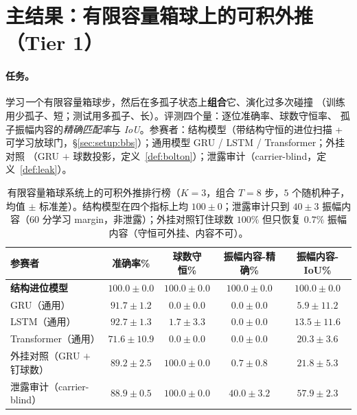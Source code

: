 \documentclass[11pt]{article}
\theoremstyle{definition}
\theoremstyle{plain}
\begin{document}
\section{主结果：有限容量箱球上的可积外推（Tier 1）}\label{sec:main}

\paragraph{任务。}
学习\emph{一}个有限容量箱球步，然后在多孤子状态上\textbf{组合}它、演化过多次碰撞
（训练用少孤子、短；测试用多孤子、长）。评测四个量：逐位准确率、球数守恒率、
孤子振幅内容的\emph{精确匹配率}与 \emph{IoU}。参赛者：结构模型（带结构守恒的进位扫描 +
可学习放球门，\S\ref{sec:setup:bbs}）；通用模型 GRU / LSTM / Transformer；外挂对照
（GRU $+$ 球数投影，定义~\ref{def:bolton}）；泄露审计（carrier-blind，定义~\ref{def:leak}）。

\begin{table}[h]
\centering
\caption{有限容量箱球系统上的可积外推排行榜（$K=3$，组合 $T=8$ 步，$5$ 个随机种子，均值 $\pm$
标准差）。结构模型在四个指标上均 $100\pm0$；泄露审计只到 $40\pm3$ 振幅内容（$60$ 分学习
margin，非泄露）；外挂对照钉住球数 $100\%$ 但只恢复 $0.7\%$ 振幅内容（守恒可外挂、内容不可）。}
\label{tab:tier1}
\begin{tabular}{lcccc}
\toprule
\textbf{参赛者} & \textbf{准确率\%} & \textbf{球数守恒\%} & \textbf{振幅内容-精确\%} & \textbf{振幅内容-IoU\%} \\
\midrule
\textbf{结构进位模型} & $\mathbf{100.0\pm0.0}$ & $\mathbf{100.0\pm0.0}$ & $\mathbf{100.0\pm0.0}$ & $\mathbf{100.0\pm0.0}$ \\
GRU（通用） & $91.7\pm1.2$ & $0.0\pm0.0$ & $0.0\pm0.0$ & $5.9\pm11.2$ \\
LSTM（通用） & $92.7\pm1.3$ & $1.7\pm3.3$ & $0.0\pm0.0$ & $13.5\pm11.6$ \\
Transformer（通用） & $71.6\pm10.9$ & $0.0\pm0.0$ & $0.0\pm0.0$ & $20.3\pm3.6$ \\
外挂对照（GRU $+$ 钉球数） & $89.2\pm2.5$ & $100.0\pm0.0$ & $0.7\pm0.8$ & $21.8\pm5.3$ \\
泄露审计（carrier-blind） & $88.9\pm0.5$ & $100.0\pm0.0$ & $40.0\pm3.2$ & $57.9\pm2.3$ \\
\bottomrule
\end{tabular}
\end{table}
\end{document}

